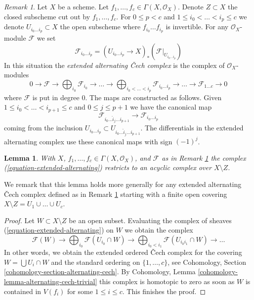 \documentclass{stacks-project}
\theoremstyle{plain}
\newtheorem{lemma}[subsection]{Lemma}
\theoremstyle{definition}
\theoremstyle{remark}
\newtheorem{remark}[subsection]{Remark}
\numberwithin{equation}{subsection}
\begin{document}
\begin{remark}
\label{remark-support-c-equations}
Let $X$ be a scheme. Let $f_1, \ldots, f_c \in \Gamma(X, \mathcal{O}_X)$.
Denote $Z \subset X$ the closed subscheme cut out by $f_1, \ldots, f_c$.
For $0 \leq p < c$ and $1 \leq i_0 < \ldots < i_p \leq c$ we denote
$U_{i_0 \ldots i_p} \subset X$ the open subscheme where
$f_{i_0} \ldots f_{i_p}$ is invertible. For any $\mathcal{O}_X$-module
$\mathcal{F}$ we set
$$
\mathcal{F}_{i_0 \ldots i_p} =
(U_{i_0 \ldots i_p} \to X)_*(\mathcal{F}|_{U_{i_0 \ldots i_p}})
$$
In this situation the {\it extended alternating {\v C}ech complex}
is the complex of $\mathcal{O}_X$-modules
\begin{equation}
\label{equation-extended-alternating}
0 \to \mathcal{F} \to
\bigoplus\nolimits_{i_0} \mathcal{F}_{i_0} \to
\ldots \to
\bigoplus\nolimits_{i_0 < \ldots < i_p} \mathcal{F}_{i_0 \ldots i_p} \to
\ldots \to \mathcal{F}_{1 \ldots c} \to 0
\end{equation}
where $\mathcal{F}$ is put in degree $0$. The maps are constructed as
follows. Given
$1 \leq i_0 < \ldots < i_{p + 1} \leq c$ and $0 \leq j \leq p + 1$ we
have the canonical map
$$
\mathcal{F}_{i_0 \ldots \hat i_j \ldots i_{p + 1}} \to
\mathcal{F}_{i_0 \ldots i_p}
$$
coming from the inclusion
$U_{i_0 \ldots i_p} \subset U_{i_0 \ldots \hat i_j \ldots i_{p + 1}}$.
The differentials in the extended alternating complex use these
canonical maps with sign $(-1)^j$.
\end{remark}

\begin{lemma}
\label{lemma-extended-alternating-zero}
With $X$, $f_1, \ldots, f_c \in \Gamma(X, \mathcal{O}_X)$, and
$\mathcal{F}$ as in Remark \ref{remark-support-c-equations}
the complex (\ref{equation-extended-alternating}) restricts to an acyclic
complex over $X \setminus Z$.
\end{lemma}

\noindent
We remark that this lemma holds more generally for any
extended alternating {\v C}ech complex defined as in
Remark \ref{remark-support-c-equations} starting with a finite
open covering $X \setminus Z = U_1 \cup \ldots \cup U_c$.

\begin{proof}
Let $W \subset X \setminus Z$ be an open subset. Evaluating the complex
of sheaves (\ref{equation-extended-alternating}) on $W$ we obtain the
complex
$$
\mathcal{F}(W) \to \bigoplus\nolimits_{i_0} \mathcal{F}(U_{i_0} \cap W) \to
\bigoplus\nolimits_{i_0 < i_1} \mathcal{F}(U_{i_0i_1} \cap W) \to \ldots
$$
In other words, we obtain the extended ordered {\v C}ech complex
for the covering $W = \bigcup U_i \cap W$ and the standard
ordering on $\{1, \ldots, c\}$, see
Cohomology, Section \ref{cohomology-section-alternating-cech}.
By Cohomology, Lemma \ref{cohomology-lemma-alternating-cech-trivial}
this complex is homotopic to zero as soon as $W$ is contained in
$V(f_i)$ for some $1 \leq i \leq c$. This finishes the proof.
\end{proof}
\end{document}

